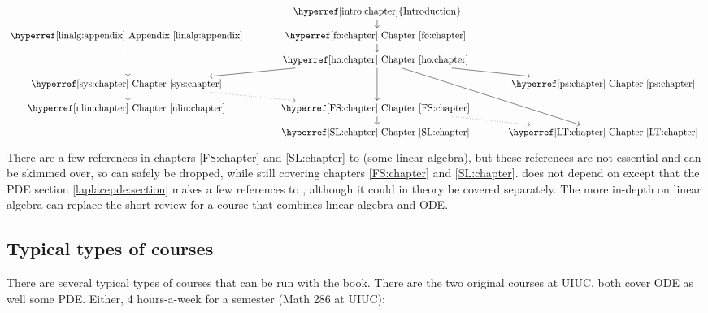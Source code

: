 \begin{equation*}
\begin{tikzcd}[cramped, row sep=small]
& {\text{\hyperref[intro:chapter]{Introduction}}} \arrow[d] \\
{\text{\Appendixref{linalg:appendix}}} \arrow[dd, dotted]
& {\text{\Chapterref{fo:chapter}}} \arrow[d] \\
& {\text{\Chapterref{ho:chapter}}} \arrow[dddr] \arrow[dd] \arrow[dl] \arrow[dr] \\
{\text{\Chapterref{sys:chapter}}} \arrow[dr, dotted] \arrow[d] & &
  {\text{\Chapterref{ps:chapter}}} \\
{\text{\Chapterref{nlin:chapter}}} & {\text{\Chapterref{FS:chapter}}} \arrow[d]
\arrow[dr,dotted] \\
& {\text{\Chapterref{SL:chapter}}}
& {\text{\Chapterref{LT:chapter}}}
\end{tikzcd}
\end{equation*}

There are a few references in chapters \ref{FS:chapter} and \ref{SL:chapter}
to  (some linear algebra), but these
references are not essential and can be skimmed over,
so 
can safely be dropped, while still covering
chapters \ref{FS:chapter} and \ref{SL:chapter}.
 does not depend on 
 except that the
PDE section \ref{laplacepde:section} makes a
few references to
,
although it could in theory be covered
separately.
The more in-depth  on linear algebra
can replace the short review 
for a course that combines linear algebra and ODE\@.

\subsection{Typical types of courses}

There are several typical types of courses that can be run with the book.
There are the two original courses at UIUC, both cover ODE as well some PDE.
Either, 4 hours-a-week for a semester (Math 286 at UIUC):

